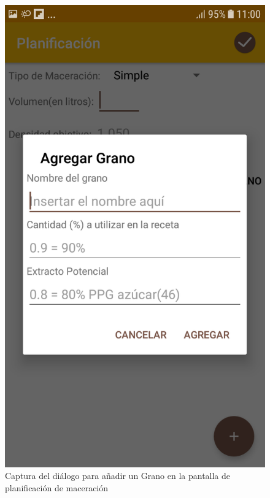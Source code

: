                 \begin{figure}[h]
                    \centering
                    \includegraphics[scale=0.2]{software/ScreenCapture/PlanningActivity-AddGrain.jpg}
                    \caption{Captura del diálogo para añadir un Grano en la pantalla de planificación de maceración}
                    \label{fig:CapturaPlanAddGrain}
                \end{figure}
